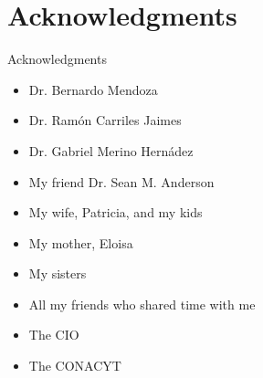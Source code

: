 \documentclass{beamer}
\begin{document}
\section{Acknowledgments} 

\begin{frame}

\begin{center}
    
{\Large Acknowledgments}

\begin{itemize}
\item Dr. Bernardo Mendoza
\item Dr. Ram\'on Carriles Jaimes
\item Dr. Gabriel Merino Hern\'adez
\item My friend Dr. Sean M. Anderson
\item My wife, Patricia, and my kids 
\item My mother, Eloisa
\item My sisters
\item All my friends who shared time with me
\item The CIO
\item The CONACYT
\end{itemize}

\end{center}

\end{frame}



{
\begin{frame}[plain]
\end{frame}
}
\end{document}

